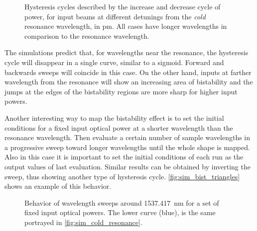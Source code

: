 \begin{figure}[ht]
	\centering
%	
%	
	
	\caption{
		Hysteresis cycles described by the increase and decrease cycle of power, for input beams at different detunings from the \textit{cold} resonance wavelength, in \si{\pm}.
		All cases have longer wavelengths in comparison to the resonance wavelength.
	}
	\label{fig:sim_bist_cycle}
\end{figure}

The simulations predict that, for wavelengths near the resonance, the hysteresis cycle will disappear in a single curve, similar to a sigmoid.
Forward and backwards sweeps will coincide in this case.
On the other hand, inputs at farther wavelength from the resonance will show an increasing area of bistability and the jumps at the edges of the bistability regions are more sharp for higher input powers.

Another interesting way to map the bistability effect is to set the initial conditions for a fixed input optical power at a shorter wavelength than the resonance wavelength.
Then evaluate a certain number of sample wavelengths in a progressive sweep toward longer wavelengths until the whole shape is mapped.
Also in this case it is important to set the initial conditions of each run as the output values of last evaluation.
Similar results can be obtained by inverting the sweep, thus showing another type of hysteresis cycle.
\autoref{fig:sim_bist_triangles} shows an example of this behavior.

\begin{figure}[ht]
	\centering
	
	\caption{Behavior of wavelength sweeps around \SI{1537.417}{\nm} for a set of fixed input optical powers. The lower curve (blue), is the same portrayed in \autoref{fig:sim_cold_resonance}. }
	\label{fig:sim_bist_triangles}
\end{figure}